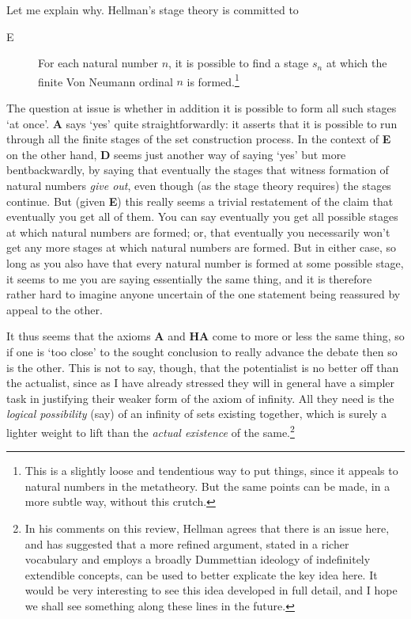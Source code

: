 \documentclass{amsart}
\theoremstyle{definition}
\begin{document}
Let me explain why. Hellman's stage theory is committed to 

\begin{description} 
    \item[E] For each natural number $n$, 
    it is possible to find a stage $s_n$ at which the 
    finite Von Neumann ordinal $n$ is formed.\footnote{
        This is a slightly loose and tendentious way to put things,
        since it appeals to natural numbers in the metatheory. But
        the same points can be made, in a more subtle way, without
        this crutch.
    }
\end{description} 
The question at issue is whether in addition it is possible to form 
all such stages `at once'. {\bf A} says `yes' quite straightforwardly: 
it asserts that it is possible to run through all the finite stages 
of the set construction process. In the context of {\bf E} on the other hand, 
{\bf D} seems just another way of saying `yes' but more bentbackwardly, 
by saying that eventually the stages that witness formation of natural numbers 
\emph{give out}, 
even though (as the stage theory requires) the stages continue. 
But (given {\bf E}) this really seems a trivial restatement of the 
claim that eventually you get all of them.  You can say eventually you get 
all possible stages at which natural numbers 
are formed; or, that eventually you necessarily won't get any more stages at which natural 
numbers are formed. But in either case,
so long as you also have that every natural 
number is formed at some possible stage,
it seems to me you are saying essentially the same thing, 
and it is therefore rather hard to imagine anyone uncertain of the 
one statement being reassured by appeal to the other.

It thus seems that the axioms {\bf A} and {\bf HA} come to more or less the 
same thing, so if one is `too close' to the sought conclusion to really advance 
the debate then so is the other. 
This is not to say, though, that the potentialist is no 
better off than the actualist, 
since as I have already stressed they will in general have 
a simpler task in justifying 
their weaker form of the axiom of infinity.
All they need is the \emph{logical possibility}
(say) of an infinity of sets existing together, which is surely 
a lighter weight to lift than the \emph{actual existence} of the same.\footnote{
    In his comments on this review, Hellman agrees that there is an issue here,
    and has suggested that a more refined argument, stated in a richer vocabulary 
    and employs a broadly Dummettian ideology of indefinitely extendible concepts,
    can be used to better explicate the key idea here. It would be very interesting 
    to see this idea developed in full detail, and I hope we shall see something 
    along these lines in the future.
}
\end{document}
